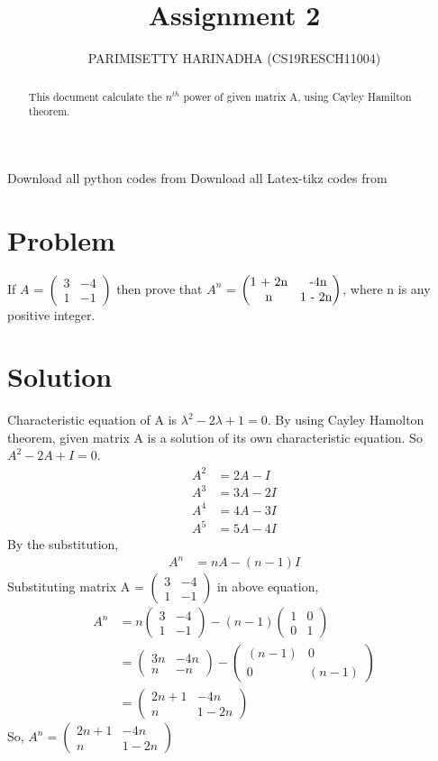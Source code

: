\documentclass[journal,12pt,twocolumn]{IEEEtran}
\title{Assignment 2}
\author{PARIMISETTY HARINADHA (CS19RESCH11004)}
\newcommand{\myvec}[1]{\ensuremath{\begin{pmatrix}#1\end{pmatrix}}}
\begin{document}
\maketitle
\newpage
\begin{abstract}
This document calculate the $n^{th}$ power of given matrix A, using Cayley Hamilton theorem.
\end{abstract}
Download all python codes from 
Download all Latex-tikz codes from 
\section{Problem}
If $A$ = \myvec{ 3 & -4 \\ 1 & -1 } then prove that $A^n$ = \myvec{ $1 + 2n$ & $ -4n$ \\ $n$ & $1 - 2n$ }, where n is any positive integer.
\section{Solution}
Characteristic equation of A is $\lambda^2 - 2\lambda + 1 = 0$.
By using Cayley Hamolton theorem, given matrix A is a solution of its own characteristic equation. So $A^2 - 2A + I = 0$.
\begin {align}
	A^2 &= 2A - I  \\
	A^3 &= 3A - 2I \\
        A^4 &= 4A - 3I \\
	A^5 &= 5A - 4I
\end{align}
 By the substitution, 
\begin {align}
	A^n &= nA - (n-1)I 
\end{align}
Substituting matrix A = \myvec{ 3 & -4 \\ 1 & -1 } in above equation,
\begin {align}
	A^n &= n\myvec{ 3 & -4 \\ 1 & -1 } - (n-1)\myvec{ 1 & 0 \\ 0 & 1 } \\
	    &=\myvec{ 3n & -4n \\ n & -n } - \myvec{ (n-1) & 0 \\ 0 & (n-1)} \\
	    &=\myvec{ 2n+1 & -4n \\ n & 1-2n }  
\end{align}
So, $A^n =\myvec{ 2n+1 & -4n \\ n & 1-2n }$  
\end{document}
